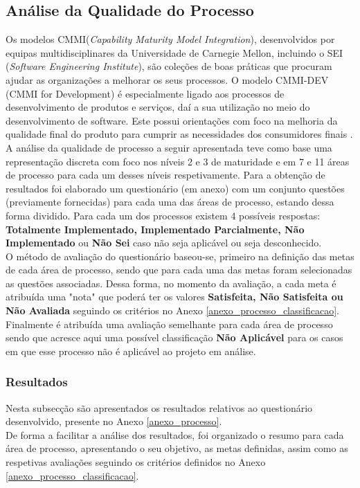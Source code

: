 \documentclass[openany,10pt,a4paper]{article}
\begin{document}
\subsection{Análise da Qualidade do Processo}
Os modelos CMMI(\textit{Capability Maturity Model Integration}), desenvolvidos por equipas multidisciplinares da Universidade de Carnegie Mellon, incluindo o SEI (\textit{Software Engineering Institute}), são coleções de boas práticas que procuram ajudar as organizações a melhorar os seus processos. O modelo CMMI-DEV (CMMI for Development) é especialmente ligado aos processos de desenvolvimento de produtos e serviços, daí a sua utilização no meio do desenvolvimento de software. Este possui orientações com foco na melhoria da qualidade final do produto para cumprir as necessidades dos consumidores finais \cite{CMMIProductTeam2010}.\\ 
A análise da qualidade de processo a seguir apresentada teve como base uma representação discreta com foco nos níveis 2 e 3 de maturidade e em 7 e 11 áreas de processo para cada um desses níveis respetivamente. Para a obtenção de resultados foi elaborado um questionário (em anexo) com um conjunto questões (previamente fornecidas) para cada uma das áreas de processo, estando dessa forma dividido. Para cada um dos processos existem 4 possíveis respostas:  \textbf{Totalmente Implementado, Implementado Parcialmente, Não Implementado} ou  \textbf{Não Sei} caso não seja aplicável ou seja desconhecido.\\
O método de avaliação do questionário baseou-se, primeiro na definição das metas de cada área de processo, sendo que para cada uma das metas foram selecionadas as questões associadas. Dessa forma, no momento da avaliação, a cada meta é atribuída uma "nota" que poderá ter os valores  \textbf{Satisfeita, Não Satisfeita ou Não Avaliada} seguindo os critérios no Anexo \ref{anexo_processo_classificacao}. Finalmente é atribuída uma avaliação semelhante para cada área de processo sendo que acresce aqui uma possível classificação \textbf{Não Aplicável} para os casos em que esse processo não é aplicável ao projeto em análise.

\subsubsection{Resultados}
Nesta subsecção são apresentados os resultados relativos ao questionário desenvolvido, presente no Anexo \ref{anexo_processo}. \\
De forma a facilitar a análise dos resultados, foi organizado o resumo para cada área de processo, apresentando o seu objetivo, as metas definidas, assim como as respetivas avaliações seguindo os critérios definidos no Anexo \ref{anexo_processo_classificacao}.
\end{document}
